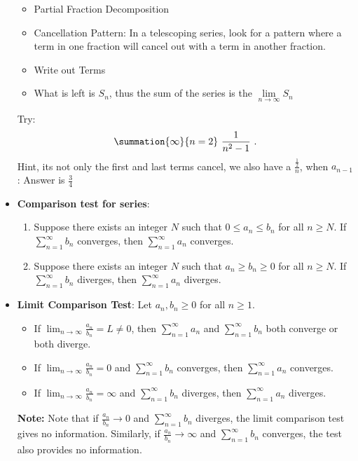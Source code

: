 \documentclass{report}
\begin{document}
\begin{itemize}
        \begin{itemize}
            \item Partial Fraction Decomposition
            \item Cancellation Pattern: In a telescoping series, look for a pattern where a term in one fraction will cancel out with a term in another fraction.
            \item Write out Terms
            \item What is left is $S_{n}$, thus the sum of the series is the $\lim\limits_{n \to \infty}{S_{n}} $
        \end{itemize}
        Try: 
        \begin{align*}
            \summation{\infty}{n=2}\ \frac{1}{n^{2}-1}\ 
        .\end{align*}
        Hint, its not only the first and last terms cancel, we also have a $\frac{\frac{1}{2}}{n}$, when $a_{n-1}$: Answer is $\frac{3}{4}$
        \pagebreak 
    \item \textbf{Comparison test for series}:
        \begin{enumerate}
            \item Suppose there exists an integer \( N \) such that \( 0 \leq a_n \leq b_n \) for all \( n \geq N \). If \( \sum_{n=1}^{\infty} b_n \) converges, then \( \sum_{n=1}^{\infty} a_n \) converges. 
            \item  Suppose there exists an integer \( N \) such that \( a_n \geq b_n \geq 0 \) for all \( n \geq N \). If \( \sum_{n=1}^{\infty} b_n \) diverges, then \( \sum_{n=1}^{\infty} a_n \) diverges.
        \end{enumerate}
    \item \textbf{Limit Comparison Test}:
        Let \( a_n, b_n \geq 0 \) for all \( n \geq 1 \).
        \begin{itemize}
            \item If \( \lim_{n \to \infty} \frac{a_n}{b_n} = L \neq 0 \), then \( \sum_{n=1}^{\infty} a_n \) and \( \sum_{n=1}^{\infty} b_n \) both converge or both diverge.
            \item If \( \lim_{n \to \infty} \frac{a_n}{b_n} = 0 \) and \( \sum_{n=1}^{\infty} b_n \) converges, then \( \sum_{n=1}^{\infty} a_n \) converges.
            \item If \( \lim_{n \to \infty} \frac{a_n}{b_n} = \infty \) and \( \sum_{n=1}^{\infty} b_n \) diverges, then \( \sum_{n=1}^{\infty} a_n \) diverges.
        \end{itemize}
        \textbf{Note:} Note that if $\frac{a_n}{b_n} \to 0$ and $\sum_{n=1}^{\infty} b_n$ diverges, the limit comparison test gives no information. Similarly, if $\frac{a_n}{b_n} \to \infty$ and $\sum_{n=1}^{\infty} b_n$ converges, the test also provides no information. 

\end{itemize}
\end{document}
